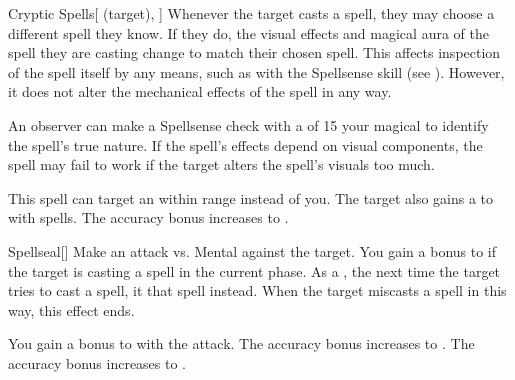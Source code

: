 \lowercase{\hypertarget{spell:Cryptic Spells}{}}\label{spell:Cryptic Spells}
\begin{attuneability}[Rank 2]{\hypertarget{spell:Cryptic Spells}{Cryptic Spells}}[ (target), ]
Whenever the target casts a spell, they may choose a different spell they know.
If they do, the visual effects and magical aura of the spell they are casting change to match their chosen spell.
This affects inspection of the spell itself by any means, such as with the Spellsense skill (see ).
However, it does not alter the mechanical effects of the spell in any way.

An observer can make a Spellsense check with a  of 15 \add your magical  to identify the spell's true nature.
If the spell's effects depend on visual components, the spell may fail to work if the target alters the spell's visuals too much.

\rankline
{} This spell can target an  within \rngmed range instead of you.
 The target also gains a   to  with spells.
 The accuracy bonus increases to .

\end{attuneability}
\vspace{0.25em}



\lowercase{\hypertarget{spell:Spellseal}{}}\label{spell:Spellseal}
\begin{freeability}[Rank 2]{\hypertarget{spell:Spellseal}{Spellseal}}[]
Make an attack vs. Mental against the target.
You gain a  bonus to  if the target is casting a spell in the current phase.
\hit As a , the next time the target tries to cast a spell, it  that spell instead.
When the target miscasts a spell in this way, this effect ends.

\rankline
{} You gain a  bonus to  with the attack.
 The accuracy bonus increases to .
 The accuracy bonus increases to .

\end{freeability}
\vspace{0.25em}



